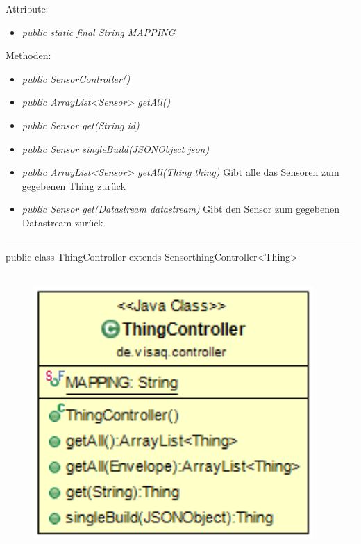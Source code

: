 Attribute:
\begin{itemize}
    \item \emph{public static final String MAPPING} \mappingDescription
\end{itemize}
Methoden:
\begin{itemize}
    \item \emph{public SensorController()}
    \item \emph{public ArrayList<Sensor> getAll()}
    \extendsSensorthingController
    \item \emph{public Sensor get(String id)}
    \extendsSensorthingController
    \item \emph{public Sensor singleBuild(JSONObject json)}
    \extendsSensorthingController
    \item \emph{public ArrayList<Sensor> getAll(Thing thing)}
    Gibt alle das Sensoren zum gegebenen Thing zurück
    \item \emph{public Sensor get(Datastream datastream)}
    Gibt den Sensor zum gegebenen Datastream zurück
\end{itemize}

\rule{\textwidth}{0.4pt}
public class ThingController extends SensorthingController<Thing>
\\\\
\begin{minipage}{0.3\textwidth}
    \begin{figure}[H]
        {\centering\includegraphics[width=0.95\textwidth]{media/backend/controller/classes/ThingController.png}}
    \end{figure}
    \end{minipage} \hfill
\begin{minipage}{0.7\textwidth}
\end{minipage}

